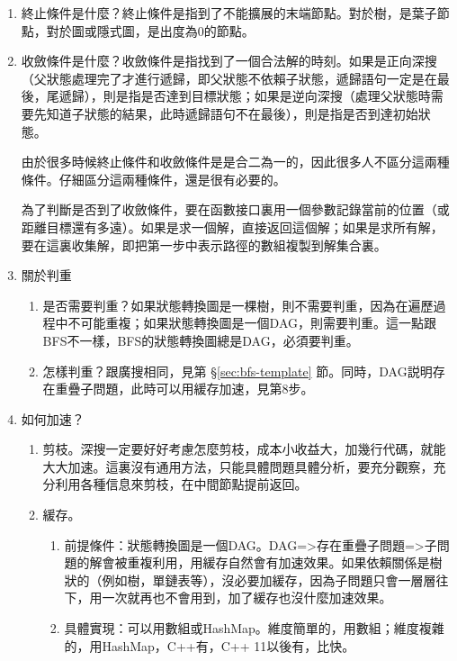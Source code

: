 \begin{enumerate}
\item 終止條件是什麼？終止條件是指到了不能擴展的末端節點。對於樹，是葉子節點，對於圖或隱式圖，是出度為0的節點。

\item {收斂條件是什麼？收斂條件是指找到了一個合法解的時刻。如果是正向深搜（父狀態處理完了才進行遞歸，即父狀態不依賴子狀態，遞歸語句一定是在最後，尾遞歸），則是指是否達到目標狀態；如果是逆向深搜（處理父狀態時需要先知道子狀態的結果，此時遞歸語句不在最後），則是指是否到達初始狀態。

由於很多時候終止條件和收斂條件是是合二為一的，因此很多人不區分這兩種條件。仔細區分這兩種條件，還是很有必要的。

為了判斷是否到了收斂條件，要在函數接口裏用一個參數記錄當前的位置（或距離目標還有多遠）。如果是求一個解，直接返回這個解；如果是求所有解，要在這裏收集解，即把第一步中表示路徑的數組複製到解集合裏。}

\item 關於判重
    \begin{enumerate}
    \item 是否需要判重？如果狀態轉換圖是一棵樹，則不需要判重，因為在遍歷過程中不可能重複；如果狀態轉換圖是一個DAG，則需要判重。這一點跟BFS不一樣，BFS的狀態轉換圖總是DAG，必須要判重。
    \item 怎樣判重？跟廣搜相同，見第 \S \ref{sec:bfs-template} 節。同時，DAG説明存在重疊子問題，此時可以用緩存加速，見第8步。
    \end{enumerate}

\item 如何加速？
    \begin{enumerate}
    \item 剪枝。深搜一定要好好考慮怎麼剪枝，成本小收益大，加幾行代碼，就能大大加速。這裏沒有通用方法，只能具體問題具體分析，要充分觀察，充分利用各種信息來剪枝，在中間節點提前返回。
    \item 緩存。
        \begin{enumerate}
            \item 前提條件：狀態轉換圖是一個DAG。DAG=>存在重疊子問題=>子問題的解會被重複利用，用緩存自然會有加速效果。如果依賴關係是樹狀的（例如樹，單鏈表等），沒必要加緩存，因為子問題只會一層層往下，用一次就再也不會用到，加了緩存也沒什麼加速效果。
            \item 具體實現：可以用數組或HashMap。維度簡單的，用數組；維度複雜的，用HashMap，C++有，C++ 11以後有，比快。
        \end{enumerate}
    
    \end{enumerate}
\end{enumerate}


